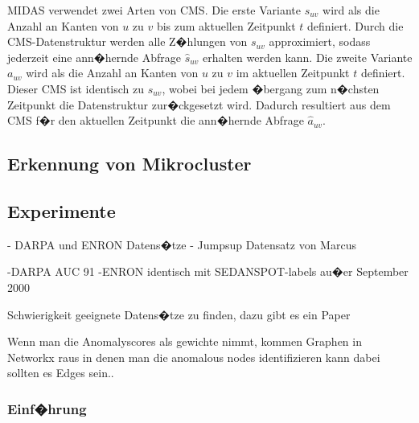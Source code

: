 MIDAS verwendet zwei Arten von CMS. Die erste Variante $s_{uv}$ wird als die Anzahl an Kanten von $u$ zu $v$ bis zum aktuellen Zeitpunkt $t$ definiert. Durch die CMS-Datenstruktur werden alle Z�hlungen von $s_{uv}$ approximiert, sodass jederzeit eine ann�hernde Abfrage $\hat{s}_{uv}$ erhalten werden kann.
Die zweite Variante $a_{uv}$ wird als die Anzahl an Kanten  von $u$ zu $v$ im aktuellen Zeitpunkt $t$ definiert. Dieser CMS ist identisch zu $s_{uv}$, wobei bei jedem �bergang zum n�chsten Zeitpunkt die Datenstruktur zur�ckgesetzt wird. Dadurch resultiert aus dem CMS f�r den aktuellen Zeitpunkt die ann�hernde Abfrage $\hat{a}_{uv}$. \citep[vgl.][S.~3]{MIDAS}




\subsection{Erkennung von Mikrocluster}
\label{sec:mc-gl-dm}


\subsection{Experimente}
\label{sec:m-ex}
- DARPA und ENRON Datens�tze
- Jumpsup Datensatz von Marcus

-DARPA AUC 91%
-ENRON identisch mit SEDANSPOT-labels au�er September 2000

Schwierigkeit geeignete Datens�tze zu finden, dazu gibt es ein Paper

Wenn man die Anomalyscores als gewichte nimmt, kommen Graphen in Networkx raus in denen man die anomalous nodes identifizieren kann dabei sollten es Edges sein..

\subsubsection{Einf�hrung}
\label{sec:mc-gl-cms-in}


